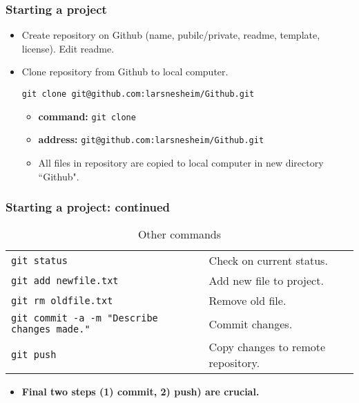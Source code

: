 \documentclass{beamer}
\begin{document}
\begin{frame}[fragile]
\frametitle{Starting a project}
\begin{itemize}
\item Create repository on Github (name, pubilc/private, readme, template, license). Edit readme.
\item Clone repository from Github to local computer.
\begin{lstlisting}
git clone git@github.com:larsnesheim/Github.git
\end{lstlisting}
\begin{itemize}
\item \textbf{command:} \lstinline{git clone} 
\item \textbf{address:} \lstinline{git@github.com:larsnesheim/Github.git} 
\item All files in repository are copied to local computer in new directory ``Github".
\end{itemize}
\end{itemize}
\end{frame}

\begin{frame}
\frametitle{Starting a project: continued}
\begin{table}[htp]
\caption{Other commands}
\begin{center}
\begin{tabular}{ll}
\hline
\lstinline{git status} & Check on current status. \\
\lstinline{git add newfile.txt} & Add new file to project. \\
\lstinline{git rm oldfile.txt} & Remove old file. \\
\lstinline{git commit -a -m "Describe changes made."} & Commit changes. \\
\lstinline{git push} & Copy changes to remote repository.
\end{tabular}
\end{center}
\label{default}
\end{table}%
\begin{itemize}
\item \textbf{Final two steps (1) commit, 2) push) are crucial.}
\end{itemize}
\end{frame}
\end{document}
